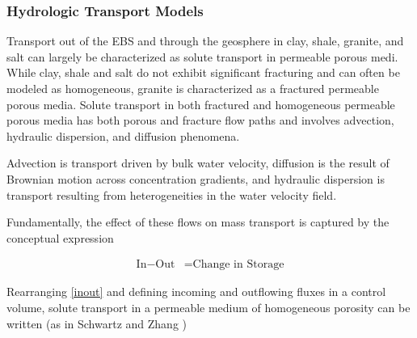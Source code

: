 
\subsubsection{Hydrologic Transport Models}

Transport out of the \gls{EBS} and through the geosphere in clay, shale, granite,
and salt can largely be characterized as solute transport in permeable porous 
medi. While clay, shale and salt do not exhibit significant fracturing and can 
often be modeled as homogeneous, granite is  characterized as a fractured 
permeable porous media.  Solute transport in both fractured and homogeneous 
permeable porous media has both porous and fracture flow paths and involves
advection, hydraulic dispersion, and diffusion phenomena. 

Advection is transport driven by bulk water velocity, diffusion is the 
result of Brownian motion across concentration gradients, and hydraulic 
dispersion is transport resulting from heterogeneities in the water velocity field. 

Fundamentally, the effect of these flows on mass transport is captured by the 
conceptual expression 

\begin{align}
  \mbox{In} - \mbox{Out} &= \mbox{Change in Storage}
  \label{inout}
\end{align} 







Rearranging \ref{inout} and defining incoming and outflowing fluxes in a control  
volume,  solute transport in a permeable medium of homogeneous porosity can be
written (as in Schwartz and Zhang \cite{schwartz_fundamentals_2004})

